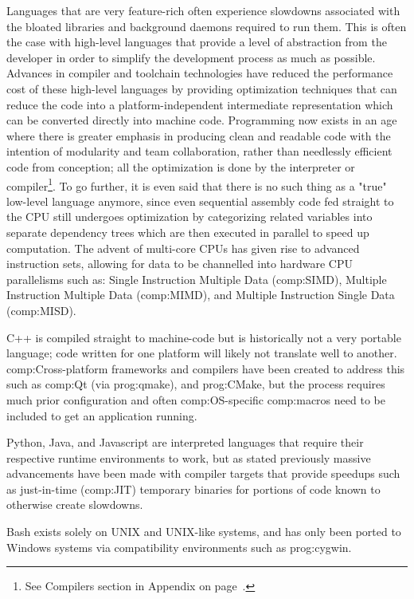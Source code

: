 Languages that are very feature-rich often experience slowdowns associated with the bloated libraries and background daemons required to run them. This is often the case with high-level languages that provide a level of abstraction from the developer in order to simplify the development process as much as possible. Advances in compiler and toolchain  technologies \cite{lattner2004llvm} have reduced the performance cost of these high-level languages by providing optimization techniques that can reduce the code into a platform-independent intermediate representation which can be converted directly into machine code. Programming now exists in an age where there is greater emphasis in producing clean and readable code with the intention of modularity and team collaboration, rather than needlessly efficient code from conception; all the optimization is done by the interpreter or compiler\footnote{See Compilers section in Appendix on page~\pageref{ref:app:compiler}.}. To go further, it is even said that there is no such thing as a "true" low-level language anymore, since even sequential assembly code fed straight to the CPU still undergoes optimization by categorizing related variables into separate dependency trees which are then executed in parallel to speed up computation. The advent of multi-core CPUs has given rise to advanced instruction sets, allowing for data to be channelled into hardware CPU parallelisms such as: Single Instruction Multiple Data (\gls{comp:SIMD}), Multiple Instruction Multiple Data (\gls{comp:MIMD}), and Multiple Instruction Single Data (\gls{comp:MISD}).

C++ is compiled straight to machine-code but is historically not a  very portable language; code written for one platform will likely not translate well to another. \gls{comp:Cross-platform} frameworks and compilers have been created to address this such as \gls{comp:Qt} (via \gls{prog:qmake}), and \gls{prog:CMake}, but the process requires much prior configuration and often \gls{comp:OS}-specific \gls{comp:macros} need to be included to get an application running.

Python, Java, and Javascript are interpreted languages that require their respective runtime environments to work, but as stated previously massive advancements have been made with compiler targets that provide speedups such as just-in-time (\gls{comp:JIT}) temporary binaries for portions of code known to otherwise create slowdowns. 

Bash exists solely on UNIX and UNIX-like systems, and has only been ported to Windows systems via compatibility environments such as \gls{prog:cygwin}. 

